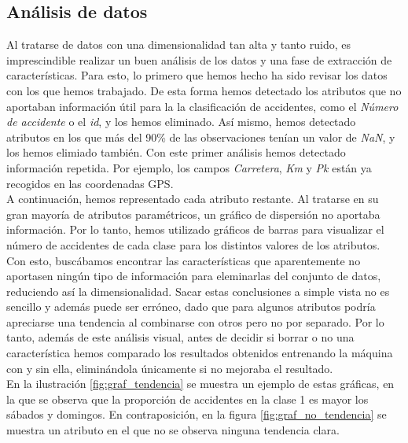 \documentclass[journal,twoside]{JoPhA}
\begin{document}
\subsection{Análisis de datos}
Al tratarse de datos con una dimensionalidad tan alta y tanto ruido, es imprescindible realizar un buen análisis de los datos y una fase de extracción de características. Para esto, lo primero que hemos hecho ha sido revisar los datos con los que hemos trabajado. De esta forma hemos detectado los atributos que no aportaban información útil para la la clasificación de accidentes, como el \textit{Número de accidente} o el \textit{id}, y los hemos eliminado. Así mismo, hemos detectado atributos en los que más del 90\% de las observaciones tenían un valor de \textit{NaN}, y los hemos elimiado también. Con este primer análisis hemos detectado información repetida. Por ejemplo, los campos \textit{Carretera}, \textit{Km} y \textit{Pk} están ya recogidos en las coordenadas GPS. \\

A continuación, hemos representado cada atributo restante. Al tratarse en su gran mayoría de atributos paramétricos, un gráfico de dispersión no aportaba información. Por lo tanto, hemos utilizado gráficos de barras para visualizar el número de accidentes de cada clase para los distintos valores de los atributos. Con esto, buscábamos encontrar las características que aparentemente no aportasen ningún tipo de información para eleminarlas del conjunto de datos, reduciendo así la dimensionalidad. Sacar estas conclusiones a simple vista no es sencillo y además puede ser erróneo, dado que para algunos atributos podría apreciarse una tendencia al combinarse con otros pero no por separado. Por lo tanto, además de este análisis visual, antes de decidir si borrar o no una característica hemos comparado los resultados obtenidos entrenando la máquina con y sin ella, eliminándola únicamente si no mejoraba el resultado. \\ En la ilustración \ref{fig:graf_tendencia} se muestra un ejemplo de estas gráficas, en la que se observa que la proporción de accidentes en la clase 1 es mayor los sábados y domingos. En contraposición, en la figura \ref{fig:graf_no_tendencia} se muestra un atributo en el que no se observa ninguna tendencia clara.
\end{document}
